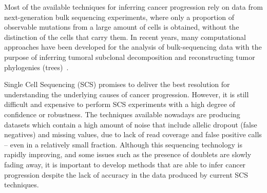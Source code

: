 \documentclass[a4paper,USenglish]{article}
\theoremstyle{definition}
\begin{document}
Most of the available techniques for inferring cancer progression rely on data from next-generation bulk sequencing experiments, where only a proportion of observable mutations from a large amount of cells is obtained, without the distinction of the cells that carry them. In recent years, many computational approaches have been developed for the analysis of bulk-sequencing data with the purpose of inferring tumoral subclonal decomposition and reconstructing tumor phylogenies (trees)~\cite{Strino2013,Jiao2014,Hajirasouliha2014,Yuan2015,Popic2015,citup,El-Kebir2016,marass2016,doi:10.1093/bioinformatics/btx270,Bonizzoni:2017:BPP:3107411.3107441}.

Single Cell Sequencing (SCS) promises to deliver the best resolution for understanding the underlying causes of cancer progression. However, it is still difficult and expensive to perform SCS experiments with a high degree of confidence or robustness. The techniques available nowadays are producing datasets which contain a high amount of noise that include allelic dropout (false negatives) and missing values, due to lack of read coverage and false positive calls -- even in a relatively small fraction. Although this sequencing technology is rapidly improving, and some issues such as the presence of doublets are slowly fading away, it is important to develop methods that are able to infer cancer progression despite the lack of accuracy in the data produced by current SCS techniques.
\end{document}
